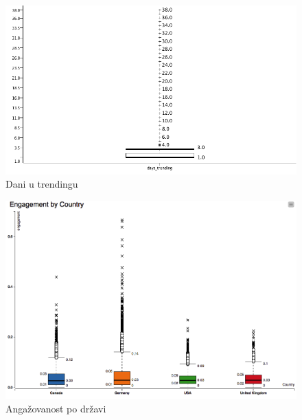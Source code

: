 \documentclass[a4paper]{article}
\theoremstyle{definition}
\begin{document}
\begin{figure}[H]
\begin{center}
    \includegraphics[width=1\textwidth]{box_trending.png}
    \caption{Dani u trendingu}
\end{center}
\end{figure}

\begin{figure}[H]
\begin{center}
    \includegraphics[width=1\textwidth]{engagement_box_plot.png}
    \caption{Angažovanost po državi}
        \label{fig:boxEngagement}
\end{center}
\end{figure}






\end{document}
